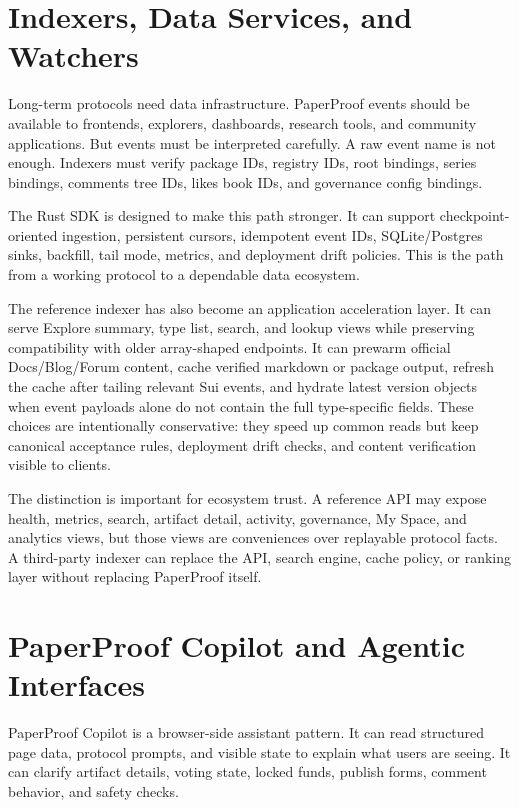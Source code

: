 \documentclass[11pt]{article}
\begin{document}
\section{Indexers, Data Services, and Watchers}

Long-term protocols need data infrastructure. PaperProof events should be
available to frontends, explorers, dashboards, research tools, and community
applications. But events must be interpreted carefully. A raw event name is not
enough. Indexers must verify package IDs, registry IDs, root bindings, series
bindings, comments tree IDs, likes book IDs, and governance config bindings.

The Rust SDK is designed to make this path stronger. It can support
checkpoint-oriented ingestion, persistent cursors, idempotent event IDs,
SQLite/Postgres sinks, backfill, tail mode, metrics, and deployment drift
policies. This is the path from a working protocol to a dependable data
ecosystem.

The reference indexer has also become an application acceleration layer. It can
serve Explore summary, type list, search, and lookup views while preserving
compatibility with older array-shaped endpoints. It can prewarm official
Docs/Blog/Forum content, cache verified markdown or package output, refresh the
cache after tailing relevant Sui events, and hydrate latest version objects when
event payloads alone do not contain the full type-specific fields. These choices
are intentionally conservative: they speed up common reads but keep canonical
acceptance rules, deployment drift checks, and content verification visible to
clients.

The distinction is important for ecosystem trust. A reference API may expose
health, metrics, search, artifact detail, activity, governance, My Space, and
analytics views, but those views are conveniences over replayable protocol
facts. A third-party indexer can replace the API, search engine, cache policy,
or ranking layer without replacing PaperProof itself.

\section{PaperProof Copilot and Agentic Interfaces}

PaperProof Copilot is a browser-side assistant pattern. It can read structured
page data, protocol prompts, and visible state to explain what users are seeing.
It can clarify artifact details, voting state, locked funds, publish forms,
comment behavior, and safety checks.
\end{document}
